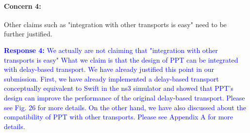 \documentclass[12pt,one-column]{article}
\begin{document}

{\it \paragraph{Concern 4:} Other claims such as "integration with other transports is easy" need to be further justified.}

\noindent\textcolor{blue}{\textbf{Response 4:} 
We actually are not claiming that "integration with other transports is easy"
What we claim is that the design of PPT can be integrated with delay-based transport.
We have already justified this point in our submission.
First, we have already implemented a delay-based transport conceptually equivalent to Swift in the ns3 simulator and showed that PPT's design can improve the performance of the original delay-based transport. Please see Fig. 26 for more details.
On the other hand, we have also discussed about the compatibility of PPT with other transports. Please see Appendix A for more details.
}
\end{document}
